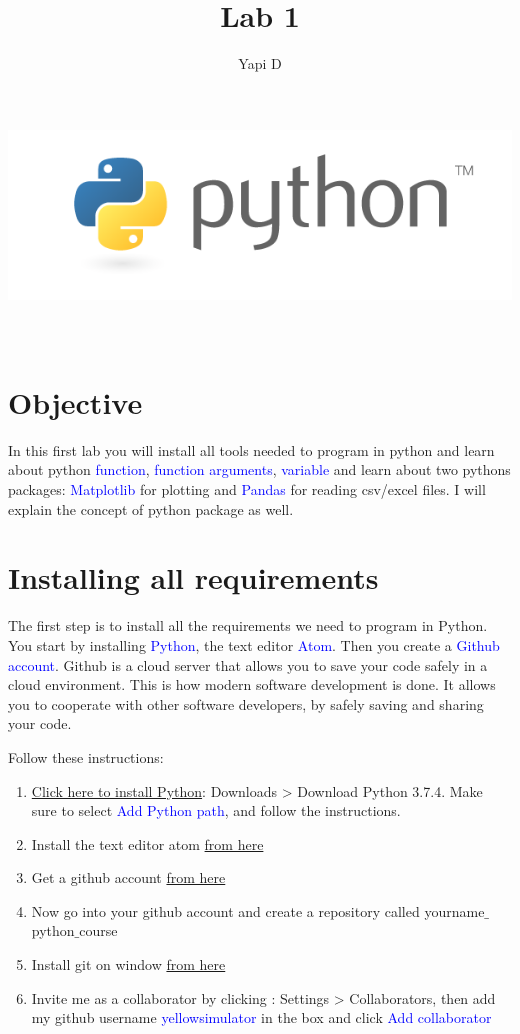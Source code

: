 \documentclass[10pt,a4paper,titlepage]{article}
\author{Yapi D}
\title{Lab 1}
\begin{document}
	\makeatletter
\begin{titlepage}
	\begin{center}
		\includegraphics[width=0.7\linewidth]{pylogo}\\[4ex]
		{\huge \bfseries  \@title }\\[2ex] 
		{\LARGE  \@author}\\[50ex] 
		{\large \@date}
	\end{center}
\end{titlepage}
\makeatother
\thispagestyle{empty}
\newpage

\section{Objective}
In this first lab you will install all tools needed to program in python and learn
about python \textcolor{blue}{function}, \textcolor{blue}{function arguments}, \textcolor{blue}{variable} and learn about two pythons packages:
\textcolor{blue}{Matplotlib} for plotting and \textcolor{blue}{Pandas} for reading csv/excel files. I will explain the concept of python package as well.
	\section{Installing all requirements}
	The first step is to install all the requirements we need to program in Python. You start by installing \textcolor{blue}{Python}, the text editor \textcolor{blue}{Atom}. Then you create a \textcolor{blue}{Github account}. Github is a cloud server that allows you to save your code safely in a cloud environment. This is how modern software development is done. It allows you to cooperate with other software developers, by safely saving and sharing your code.
	
	\justify
	Follow these instructions:
	\justify
	\begin{enumerate}
		\item \href{https://www.python.org/downloads/release/python-374/}{Click here to install Python}: Downloads > Download Python 3.7.4. Make sure to select \textcolor{blue}{Add Python path}, and follow the instructions.
		\item Install the text editor atom \href{https://atom.io/}{ from here}
		\item Get a github account \href{https://github.com/}{from here}
		\item Now go into your github account and create a repository called yourname$\_$python$\_$course
		\item Install git on window \href{https://git-scm.com/downloads}{from here}
		\item Invite me as a collaborator by clicking : Settings > Collaborators,  then add my github username \textcolor{blue}{yellowsimulator} in the box and click \textcolor{blue}{Add collaborator}
	\end{enumerate}
\end{document}
